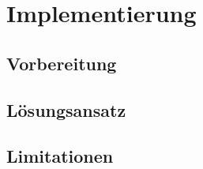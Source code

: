 \section{Implementierung}
\subsection{Vorbereitung}
\subsection{Lösungsansatz}
\subsection{Limitationen}


\newpage
